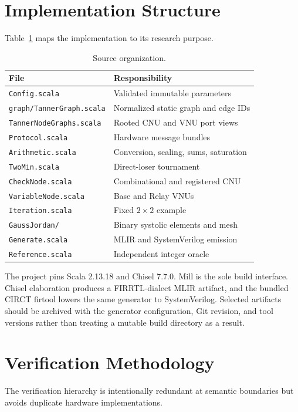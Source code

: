 \documentclass[10pt,conference]{IEEEtran}
\begin{document}
\section{Implementation Structure}
Table~\ref{tab:files} maps the implementation to its research purpose.

\begin{table}[t]
\caption{Source organization.}
\label{tab:files}
\centering
\begin{tabular}{@{}ll@{}}
\toprule
File & Responsibility \\
\midrule
\texttt{Config.scala} & Validated immutable parameters \\
\texttt{graph/TannerGraph.scala} & Normalized static graph and edge IDs \\
\texttt{TannerNodeGraphs.scala} & Rooted CNU and VNU port views \\
\texttt{Protocol.scala} & Hardware message bundles \\
\texttt{Arithmetic.scala} & Conversion, scaling, sums, saturation \\
\texttt{TwoMin.scala} & Direct-loser tournament \\
\texttt{CheckNode.scala} & Combinational and registered CNU \\
\texttt{VariableNode.scala} & Base and Relay VNUs \\
\texttt{Iteration.scala} & Fixed $2\times2$ example \\
\texttt{GaussJordan/} & Binary systolic elements and mesh \\
\texttt{Generate.scala} & MLIR and SystemVerilog emission \\
\texttt{Reference.scala} & Independent integer oracle \\
\bottomrule
\end{tabular}
\end{table}

The project pins Scala 2.13.18 and Chisel 7.7.0.  Mill is the sole build
interface.  Chisel elaboration produces a FIRRTL-dialect MLIR artifact, and the
bundled CIRCT firtool lowers the same generator to SystemVerilog.  Selected
artifacts should be archived with the generator configuration, Git revision,
and tool versions rather than treating a mutable build directory as a result.

\section{Verification Methodology}
The verification hierarchy is intentionally redundant at semantic boundaries
but avoids duplicate hardware implementations.
\end{document}
